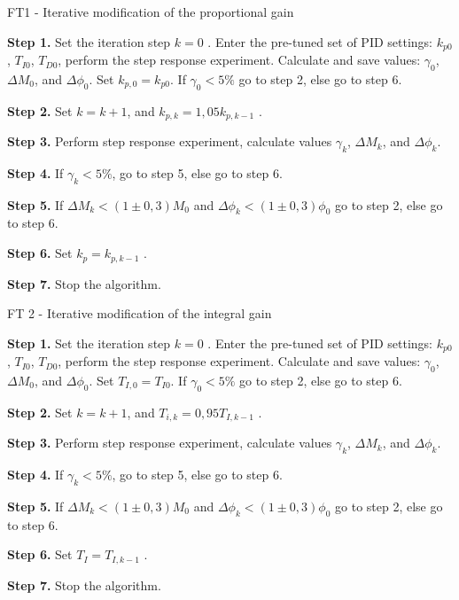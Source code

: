 \documentclass{amcs}
\begin{document}
\begin{algorithm}[!h]
	\caption{FT1 - Iterative modification of the proportional gain}
	\label{a:alg1}
	\textbf{Step 1.} Set the iteration step $k=0$ . Enter the pre-tuned set of PID settings: $k_{p0}$, $T_{I0}$, $T_{D0}$, perform the step response experiment. Calculate and save values: $\gamma_{0}$, $\Delta M_{0}$, and $\Delta \phi_{0}$. Set $k_{p,0}=k_{p0}$. If $\gamma_{0}<5\%$ go to step 2, else go to step 6. 
	
	\smallskip
	\textbf{Step 2.} Set $k=k+1$, and $k_{p,k}=1,05k_{p,k-1}$  .
	
	\smallskip
	\textbf{Step 3.} Perform step response experiment, calculate values $\gamma_{k}$, $\Delta M_{k}$, and $\Delta \phi_{k}$.
	
	\smallskip
	\textbf{Step 4.} If $\gamma_{k}<5\%$, go to step 5, else go to step 6.
	
	\smallskip
	\textbf{Step 5.} If $\Delta M_{k}<(1\pm0,3)M_{0}$  and $\Delta \phi_{k}<(1\pm0,3)\phi_{0}$  go to step 2, else go to step 6.
	
	\smallskip
	\textbf{Step 6.} Set $k_{p}=k_{p,k-1}$ .
	
	\smallskip
	\textbf{Step 7.} Stop the algorithm.
\end{algorithm}

\begin{algorithm}[!h]
	\caption{FT 2 - Iterative modification of the integral gain}
	\label{a:alg1}
	\textbf{Step 1.} Set the iteration step $k=0$ . Enter the pre-tuned set of PID settings: $k_{p0}$, $T_{I0}$, $T_{D0}$, perform the step response experiment. Calculate and save values: $\gamma_{0}$, $\Delta M_{0}$, and $\Delta \phi_{0}$. Set $T_{I,0}=T_{I0}$. If $\gamma_{0}<5\%$ go to step 2, else go to step 6. 
	
	\smallskip
	\textbf{Step 2.} Set $k=k+1$, and $T_{i,k}=0,95 T_{I,k-1}$  .
	
	\smallskip
	\textbf{Step 3.} Perform step response experiment, calculate values $\gamma_{k}$, $\Delta M_{k}$, and $\Delta \phi_{k}$.
	
	\smallskip
	\textbf{Step 4.} If $\gamma_{k}<5\%$, go to step 5, else go to step 6.
	
	\smallskip
	\textbf{Step 5.} If $\Delta M_{k}<(1\pm0,3)M_{0}$  and $\Delta \phi_{k}<(1\pm0,3)\phi_{0}$  go to step 2, else go to step 6.
	
	\smallskip
	\textbf{Step 6.} Set $T_{I}=T_{I,k-1}$ .
	
	\smallskip
	\textbf{Step 7.} Stop the algorithm.
\end{algorithm}
\end{document}
